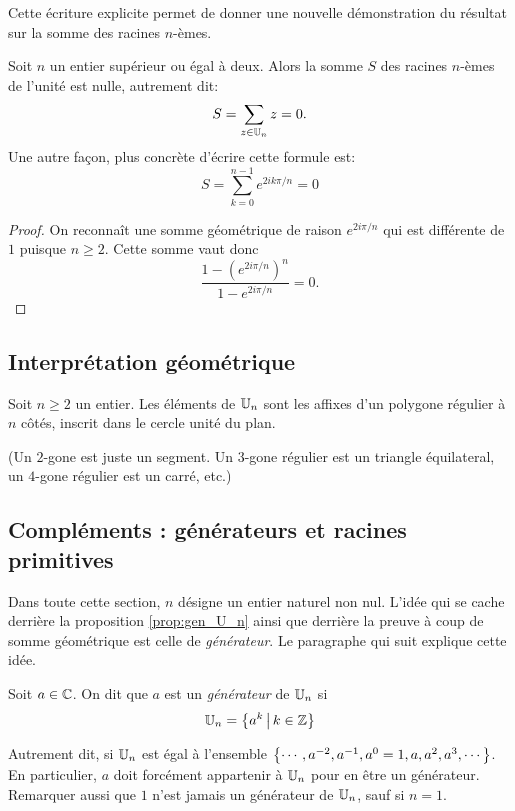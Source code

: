 Cette écriture explicite permet de donner une nouvelle démonstration du résultat sur la somme des racines $n$-èmes.

\begin{proposition}
Soit $n$ un entier supérieur ou égal à deux. Alors la somme $S$ des racines $n$-èmes de l'unité est nulle, autrement dit:
\[ S=\sum_{z\in \mathbb{U}_n}z = 0.\]
Une autre façon, plus concrète d'écrire cette formule est:
\[ S=\sum_{k=0}^{n-1}e^{2ik\pi/n} = 0\]
\end{proposition}
\begin{proof}
On reconnaît une somme géométrique de raison $e^{2i\pi/n}$ qui est différente de $1$ puisque $n\geq 2$. Cette somme vaut donc
\[ \frac{1-\left(e^{2i\pi/n}\right)^n}{1-e^{2i\pi/n}} = 0.\]
\end{proof}

\subsection{Interprétation géométrique}

\begin{proposition}Soit $n\geq 2$ un entier. 
Les éléments de $\mathbb{U}_n$ sont les affixes d'un polygone régulier à $n$ côtés, inscrit dans le cercle unité du plan.
\end{proposition}

(Un $2$-gone est juste un segment. Un $3$-gone régulier est un triangle équilateral, un $4$-gone régulier est un carré, etc.)


\subsection{Compléments : générateurs et racines primitives}

Dans toute cette section, $n$ désigne un entier naturel non nul. L'idée qui se cache derrière la proposition \ref{prop:gen_U_n} ainsi que derrière la preuve à coup de somme géométrique est celle de \emph{générateur}. Le paragraphe qui suit explique cette idée.

\begin{definition}
Soit $a\in\mathbb{C}$. On dit que $a$ est un \emph{générateur} de $\mathbb{U}_n$ si
\[ \U_n = \ensemble{a^k}{k\in\Z}\]
\end{definition}

Autrement dit, si $\mathbb{U}_n$ est égal à l'ensemble $\left\{\cdots , a^{-2}, a^{-1}, a^0=1, a, a^2, a^3, \cdots\right\}$. En particulier, $a$ doit forcément appartenir à $\mathbb{U}_n$ pour en être un générateur. Remarquer aussi que $1$ n'est jamais un générateur de $\mathbb{U}_n$, sauf si $n=1$.

